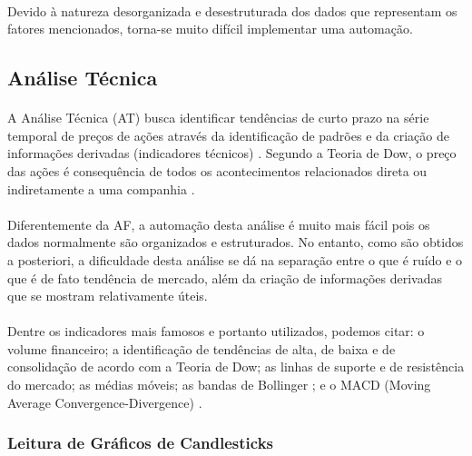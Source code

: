 \paragraph{} Devido à natureza desorganizada e desestruturada dos dados que representam os fatores mencionados, torna-se muito difícil implementar uma automação.

\subsection{Análise Técnica}
\label{subsection:at}

\paragraph{} A Análise Técnica (AT) busca identificar tendências de curto prazo na série temporal de preços de ações através da identificação de padrões e da criação de informações derivadas (indicadores técnicos) \cite{murphy1999technical, edwards2018technical}. Segundo a Teoria de Dow, o preço das ações é consequência de todos os acontecimentos relacionados direta ou indiretamente a uma companhia \cite{kirkpatrick2010technical}.

\paragraph{} Diferentemente da AF, a automação desta análise é muito mais fácil pois os dados normalmente são organizados e estruturados. No entanto, como são obtidos a posteriori, a dificuldade desta análise se dá na separação entre o que é ruído e o que é de fato tendência de mercado, além da criação de informações derivadas que se mostram relativamente úteis.

\paragraph{} Dentre os indicadores mais famosos e portanto utilizados, podemos citar: o volume financeiro; a identificação de tendências de alta, de baixa e de consolidação de acordo com a Teoria de Dow; as linhas de suporte e de resistência do mercado; as médias móveis; as bandas de Bollinger \cite{bollinger2002bollinger}; e o MACD (Moving Average Convergence-Divergence) \cite{appel2007understanding}.

\subsubsection*{Leitura de Gráficos de Candlesticks}

